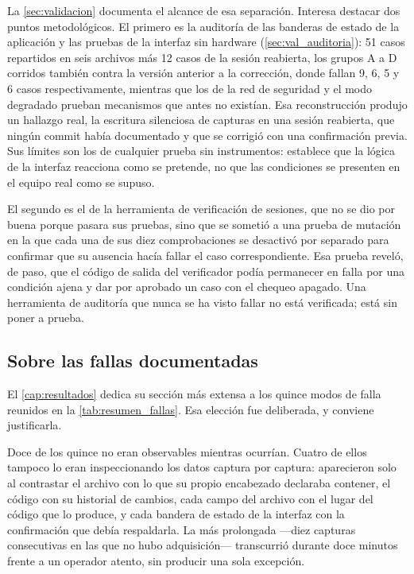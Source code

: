 La \cref{sec:validacion} documenta el alcance de esa separación.
Interesa destacar dos puntos metodológicos. El primero es la auditoría
de las banderas de estado de la aplicación y las pruebas de la interfaz
sin hardware (\cref{sec:val_auditoria}): 51 casos repartidos en seis
archivos más 12 casos de la sesión reabierta, los grupos A a D
corridos también contra la versión anterior a la corrección, donde
fallan 9, 6, 5 y 6 casos respectivamente, mientras que los de la red de
seguridad y el modo degradado prueban mecanismos que antes no existían. Esa reconstrucción produjo un hallazgo real, la escritura
silenciosa de capturas en una sesión reabierta, que ningún commit había
documentado y que se corrigió con una confirmación previa. Sus límites
son los de cualquier prueba sin instrumentos: establece que la lógica de
la interfaz reacciona como se pretende, no que las condiciones se
presenten en el equipo real como se supuso.

El segundo es el de la herramienta de verificación de sesiones, que no
se dio por buena porque pasara sus pruebas, sino que se sometió a una prueba de mutación en la que cada una de sus diez
comprobaciones se desactivó por separado para confirmar que su ausencia
hacía fallar el caso correspondiente. Esa prueba reveló, de paso, que el
código de salida del verificador podía permanecer en falla por una
condición ajena y dar por aprobado un caso con el chequeo apagado. Una
herramienta de auditoría que nunca se ha visto fallar no está
verificada; está sin poner a prueba.

\subsection*{Sobre las fallas documentadas}

El \cref{cap:resultados} dedica su sección más extensa a los quince
modos de falla reunidos en la \cref{tab:resumen_fallas}. Esa elección
fue deliberada, y conviene justificarla.

Doce de los quince no eran observables mientras ocurrían. Cuatro de
ellos tampoco lo eran inspeccionando los datos captura por captura:
aparecieron solo al contrastar el archivo con lo que su propio
encabezado declaraba contener, el código con su historial de cambios,
cada campo del archivo con el lugar del código que lo produce, y cada
bandera de estado de la interfaz con la confirmación que debía
respaldarla. La más prolongada
—diez capturas consecutivas en las que no hubo adquisición— transcurrió
durante doce minutos frente a un operador atento, sin producir una sola
excepción.

